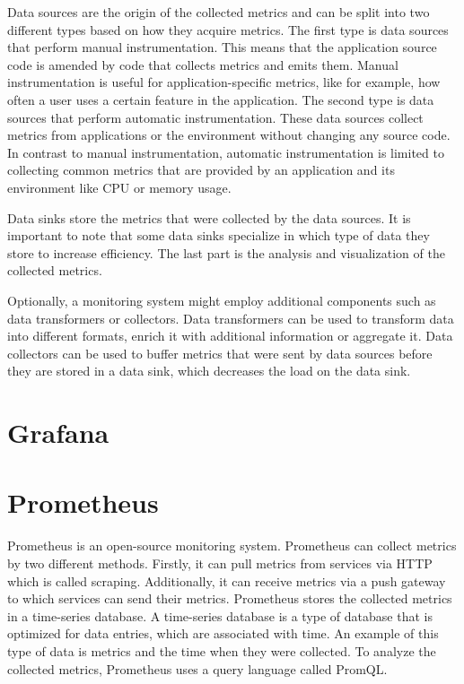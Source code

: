 Data sources are the origin of the collected metrics and can be split into two different types
based on how they acquire metrics. The first type is data sources that perform manual instrumentation.
This means that the application source code is amended by code that collects metrics and emits them.
Manual instrumentation is useful for application-specific metrics, like for example, how often a user
uses a certain feature in the application.
The second type is data sources that perform automatic instrumentation.
These data sources collect metrics from applications or the environment without changing any source code.
In contrast to manual instrumentation, automatic instrumentation is limited to collecting
common metrics that are provided by an application and its environment like CPU or memory usage.

Data sinks store the metrics that were collected by the data sources.
It is important to note that some data sinks specialize in which type of data they store
to increase efficiency. The last part is the analysis and visualization of the collected metrics.

Optionally, a monitoring system might employ additional components such as data transformers or collectors.
Data transformers can be used to transform data into different formats, enrich it with additional information
or aggregate it.
Data collectors can be used to buffer metrics that were sent by data sources before they are stored in a data sink,
which decreases the load on the data sink.

\section{Grafana}

\section{Prometheus}
Prometheus is an open-source monitoring system.
Prometheus can collect metrics by two different methods.
Firstly, it can pull metrics from services via HTTP which is called scraping.
Additionally, it can receive metrics via a push gateway to which services can send their metrics.
Prometheus stores the collected metrics in a time-series database.
A time-series database is a type of database that is optimized for data entries,
which are associated with time. An example of this type of data is metrics and the time when they were collected.
To analyze the collected metrics, Prometheus uses a query language called PromQL.

